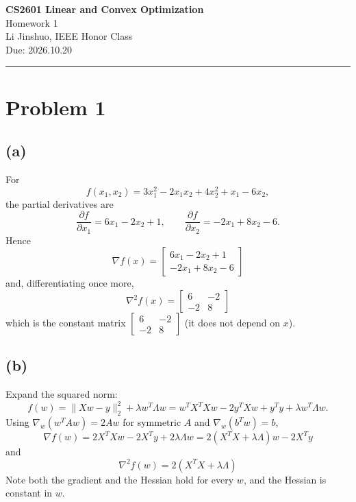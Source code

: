 \documentclass[UTF8,a4paper,12pt]{ctexart}
\begin{document}
\begin{center}
  {\LARGE\bfseries CS2601 Linear and Convex Optimization}\\[0.5em]
  {\large Homework 1}\\[0.9em]
  {\normalsize Li Jinshuo, IEEE Honor Class}\\[0.35em]
  {\small Due: 2026.10.20}
\end{center}
\vspace{-0.2em}
{\centering\textcolor{black!30}{\rule{0.9\textwidth}{0.8pt}}\par}
\vspace{0.8em}

\section*{Problem 1}

\subsection*{(a)}
For
\[
f(x_1,x_2)=3x_1^2-2x_1x_2+4x_2^2+x_1-6x_2,
\]
the partial derivatives are
\[
\frac{\partial f}{\partial x_1}=6x_1-2x_2+1,
\qquad
\frac{\partial f}{\partial x_2}=-2x_1+8x_2-6 .
\]
Hence
\[
\boxed{
\nabla f(x)=
\begin{bmatrix}
6x_1-2x_2+1\\[2pt]
-2x_1+8x_2-6
\end{bmatrix}
}
\]
and, differentiating once more,
\[
\boxed{
\nabla^2 f(x)=
\begin{bmatrix}
6 & -2\\[2pt]
-2 & 8
\end{bmatrix}
}
\]
which is the constant matrix
$\begin{bmatrix}6&-2\\-2&8\end{bmatrix}$ (it does not depend on $x$).

\subsection*{(b)}
Expand the squared norm:
\[
f(w)=\lVert Xw-y\rVert_2^2+\lambda w^T\Lambda w
=w^TX^TXw-2y^TXw+y^Ty+\lambda w^T\Lambda w .
\]
Using $\nabla_w(w^TAw)=2Aw$ for symmetric $A$ and $\nabla_w(b^Tw)=b$,
\[
\boxed{
\nabla f(w)=2X^TXw-2X^Ty+2\lambda\Lambda w
=2\left(X^TX+\lambda\Lambda\right)w-2X^Ty
}
\]
and
\[
\boxed{
\nabla^2 f(w)=2\left(X^TX+\lambda\Lambda\right)
}
\]
Note both the gradient and the Hessian hold for every $w$, and the Hessian is
constant in $w$.
\end{document}
